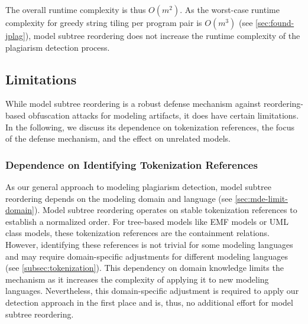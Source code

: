 The overall runtime complexity is thus $O(m^2)$.
As the worst-case runtime complexity for greedy string tiling per program pair is \( O(m^3) \) (see \autoref{sec:found-jplag}), model subtree reordering does not increase the runtime complexity of the plagiarism detection process.

\subsection{Limitations}\label{sec:msr-limits}
While model subtree reordering is a robust defense mechanism against reordering-based obfuscation attacks for modeling artifacts, it does have certain limitations. In the following, we discuss its dependence on tokenization references, the focus of the defense mechanism, and the effect on unrelated models.

    \subsubsection{Dependence on Identifying Tokenization References} As our general approach to modeling plagiarism detection, model subtree reordering 
    depends on the modeling domain and language (see \autoref{sec:mde-limit-domain}). Model subtree reordering operates on stable tokenization references to establish a normalized order. For tree-based models like \ac{EMF} models or \ac{UML} class models, these tokenization references are the containment relations. However, identifying these references is not trivial for some modeling languages and may require domain-specific adjustments for different modeling languages (see \autoref{subsec:tokenization}). This dependency on domain knowledge limits the mechanism as it increases the complexity of applying it to new modeling languages. Nevertheless, this domain-specific adjustment is required to apply our detection approach in the first place and is, thus, no additional effort for model subtree reordering.
    
